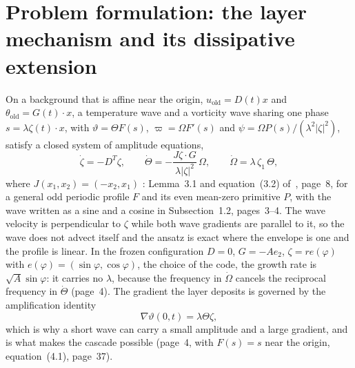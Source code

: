 \documentclass[11pt]{article}
\theoremstyle{remark}
\newcommand{\ev}[1]{\hspace{0.2em}{\small\textsf{[#1]}}}
\begin{document}
\section{Problem formulation: the layer mechanism and its dissipative extension}\label{sec:mechanism}

On a background that is affine near the origin, $u_{\mathrm{old}}=D(t)x$ and
$\theta_{\mathrm{old}}=G(t)\cdot x$, a temperature wave and a vorticity wave sharing one phase
$s=\lambda\zeta(t)\cdot x$, with $\vartheta=\Theta F(s)$, $\varpi=\Omega F'(s)$ and
$\psi=\Omega P(s)/(\lambda^{2}|\zeta|^{2})$, satisfy a closed system of amplitude equations,
\begin{equation}\label{eq:mod}
\dot\zeta=-D^{T}\zeta,\qquad
\dot\Theta=-\frac{J\zeta\cdot G}{\lambda|\zeta|^{2}}\,\Omega,\qquad
\dot\Omega=\lambda\,\zeta_{1}\,\Theta ,
\end{equation}
where $J(x_{1},x_{2})=(-x_{2},x_{1})$ \ev{V}: Lemma~3.1 and equation~(3.2) of~\cite{ab-boussinesq},
page~8, for a general odd periodic profile $F$ and its even mean-zero primitive $P$, with the wave
written as a sine and a cosine in Subsection~1.2, pages~3--4. The wave velocity is perpendicular to
$\zeta$ while both wave gradients are parallel to it, so the wave does not advect itself and the ansatz
is exact where the envelope is one and the profile is linear. In the frozen configuration $D=0$,
$G=-Ae_{2}$, $\zeta=re(\varphi)$ with $e(\varphi)=(\sin\varphi,\cos\varphi)$, the choice of the code, the growth rate is $\sqrt A\sin\varphi$: it carries no $\lambda$,
because the frequency in $\dot\Omega$ cancels the reciprocal frequency in $\dot\Theta$ \ev{V}
(page~4). The gradient the layer deposits is governed by the amplification identity
\begin{equation}\label{eq:amp}
\nabla\vartheta(0,t)=\lambda\Theta\zeta ,
\end{equation}
which is why a short wave can carry a small amplitude and a large gradient, and is what makes the
cascade possible \ev{V} (page~4, with $F(s)=s$ near the origin, equation~(4.1), page~37).
\end{document}
